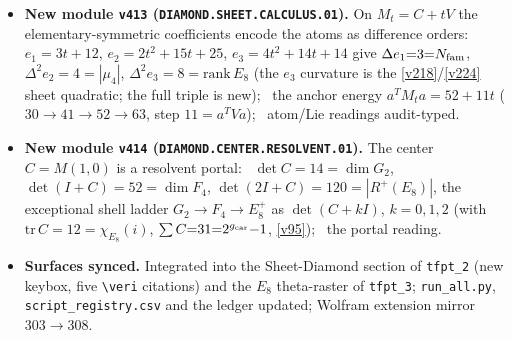 \begin{itemize}
$\det(I{+}J){=}12{=}\dim\mathfrak g_{\mathrm{SM}}$ and $\det(2I{+}J){=}40{=}|R(D_5)|$; \mC\ the Lie readings
audit-typed like the $G_2/F_4$ shadows.
\item \textbf{New module \texttt{v413} (\texttt{DIAMOND.SHEET.CALCULUS.01}).} On $M_t{=}C{+}tV$ the
elementary-symmetric coefficients encode the atoms as difference orders: $e_1{=}3t{+}12$, $e_2{=}2t^2{+}15t{+}25$,
$e_3{=}4t^2{+}14t{+}14$ give $\Delta e_1{=}3{=}N_{\mathrm{fam}}$, $\Delta^2 e_2{=}4{=}|\mu_4|$, $\Delta^2 e_3{=}8{=}\mathrm{rank}\,E_8$
(the $e_3$ curvature is the \vref{v218}/\vref{v224} sheet quadratic; the full triple is new); \mE\ the anchor energy
$a^TM_ta{=}52{+}11t$ ($30{\to}41{\to}52{\to}63$, step $11{=}a^TVa$); \mC\ atom/Lie readings audit-typed.
\item \textbf{New module \texttt{v414} (\texttt{DIAMOND.CENTER.RESOLVENT.01}).} The center $C{=}M(1,0)$ is a resolvent
portal: \mE\ $\det C{=}14{=}\dim G_2$, $\det(I{+}C){=}52{=}\dim F_4$, $\det(2I{+}C){=}120{=}|R^+(E_8)|$, the exceptional
shell ladder $G_2{\to}F_4{\to}E_8^+$ as $\det(C{+}kI)$, $k{=}0,1,2$ (with $\mathrm{tr}\,C{=}12{=}\chi_{E_8}(i)$,
$\sum C{=}31{=}2^{g_{\mathrm{car}}}{-}1$, \vref{v95}); \mC\ the portal reading.
\item \textbf{Surfaces synced.} Integrated into the Sheet-Diamond section of \texttt{tfpt\_2} (new keybox, five
\texttt{\textbackslash veri} citations) and the $E_8$ theta-raster of \texttt{tfpt\_3}; \texttt{run\_all.py},
\texttt{script\_registry.csv} and the ledger updated; Wolfram extension mirror $303\to308$.
\end{itemize}

